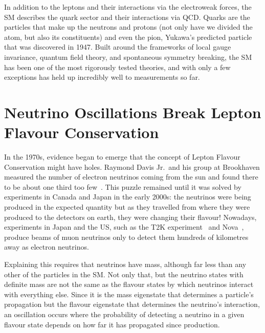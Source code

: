 In addition to the leptons and their interactions via the electroweak forces, the \ac{SM} describes the quark sector and their interactions via \ac{QCD}.
Quarks are the particles that make up the neutrons and protons (not only have we divided the atom, but also its constituents) and even the pion, Yukawa's predicted particle that was discovered in 1947.
Built around the frameworks of local gauge invariance, quantum field theory, and spontaneous symmetry breaking, the \ac{SM} has been one of the most rigorously tested theories, and with only a few exceptions has held up incredibly well to measurements so far.

\section{Neutrino Oscillations Break Lepton Flavour Conservation}
In the 1970s, evidence began to emerge that the concept of Lepton Flavour Conservation might have holes.
Raymond Davis Jr.\ and his group at Brookhaven measured the number of electron neutrinos coming from the sun and found there to be about one third too few~\cite{}.
This puzzle remained until it was solved by experiments in Canada and Japan in the early 2000s: the neutrinos were being produced in the expected quantity but as they travelled from where they were produced to the detectors on earth, they were changing their flavour!
Nowadays, experiments in Japan and the US, such as the T2K experiment~\cite{T2K:nim} and Nova~\cite{}, produce beams of muon neutrinos only to detect them hundreds of kilometres away as electron neutrinos.

Explaining this requires that neutrinos have mass, although far less than any other of the particles in the \ac{SM}.
Not only that, but the neutrino states with definite mass are not the same as the flavour states by which neutrinos interact with everything else.
Since it is the mass eigenstate that determines a particle's propagation but the flavour eigenstate that determines the neutrino's interaction, an oscillation occurs where the probability of detecting a neutrino in a given flavour state depends on how far it has propagated since production.
\FigTheoryMuEGammViaNeutrino

